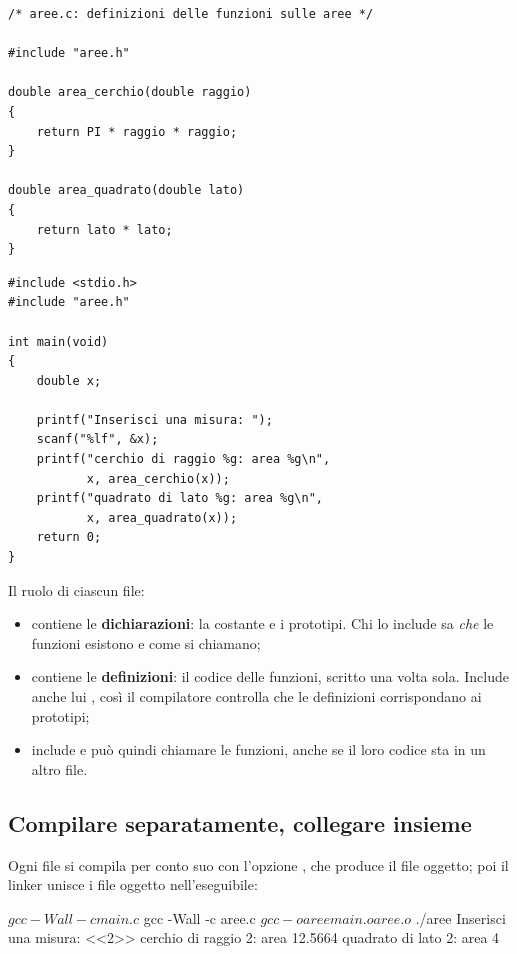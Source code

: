 \begin{affianco}[0.46]
\begin{lstlisting}[style=c, name=aree.c]
/* aree.c: definizioni delle funzioni sulle aree */

#include "aree.h"

double area_cerchio(double raggio)
{
    return PI * raggio * raggio;
}

double area_quadrato(double lato)
{
    return lato * lato;
}
\end{lstlisting}
\risultato
\begin{lstlisting}[style=c, name=main.c]
#include <stdio.h>
#include "aree.h"

int main(void)
{
    double x;

    printf("Inserisci una misura: ");
    scanf("%lf", &x);
    printf("cerchio di raggio %g: area %g\n",
           x, area_cerchio(x));
    printf("quadrato di lato %g: area %g\n",
           x, area_quadrato(x));
    return 0;
}
\end{lstlisting}
\end{affianco}

Il ruolo di ciascun file:

\begin{itemize}
  \item {} contiene le \textbf{dichiarazioni}: la costante e i
        prototipi. Chi lo include sa \textit{che} le funzioni esistono e come
        si chiamano;
  \item {} contiene le \textbf{definizioni}: il codice delle
        funzioni, scritto una volta sola. Include anche lui ,
        così il compilatore controlla che le definizioni corrispondano ai
        prototipi;
  \item {} include  e può quindi chiamare le
        funzioni, anche se il loro codice sta in un altro file.
\end{itemize}

\subsection{Compilare separatamente, collegare insieme}

Ogni file  si compila per conto suo con l'opzione , che
produce il file oggetto; poi il linker unisce i file oggetto
nell'eseguibile:

\begin{console}
$ gcc -Wall -c main.c
$ gcc -Wall -c aree.c
$ gcc -o aree main.o aree.o
$ ./aree
Inserisci una misura: <<2>>
cerchio di raggio 2: area 12.5664
quadrato di lato 2: area 4
\end{console}

